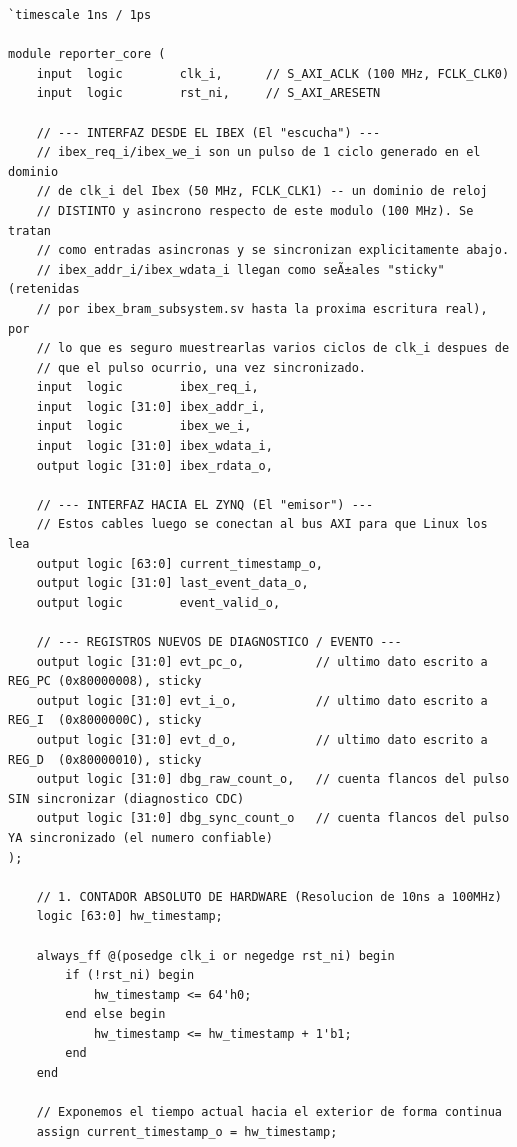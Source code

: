 \begin{lstlisting}[style=verilogstyle, basicstyle=\ttfamily\footnotesize, caption={Código fuente del subsistema \texttt{reporter\_core.sv}}, label={code:reporter_core.sv}]
`timescale 1ns / 1ps

module reporter_core (
    input  logic        clk_i,      // S_AXI_ACLK (100 MHz, FCLK_CLK0)
    input  logic        rst_ni,     // S_AXI_ARESETN

    // --- INTERFAZ DESDE EL IBEX (El "escucha") ---
    // ibex_req_i/ibex_we_i son un pulso de 1 ciclo generado en el dominio
    // de clk_i del Ibex (50 MHz, FCLK_CLK1) -- un dominio de reloj
    // DISTINTO y asincrono respecto de este modulo (100 MHz). Se tratan
    // como entradas asincronas y se sincronizan explicitamente abajo.
    // ibex_addr_i/ibex_wdata_i llegan como seÃ±ales "sticky" (retenidas
    // por ibex_bram_subsystem.sv hasta la proxima escritura real), por
    // lo que es seguro muestrearlas varios ciclos de clk_i despues de
    // que el pulso ocurrio, una vez sincronizado.
    input  logic        ibex_req_i,
    input  logic [31:0] ibex_addr_i,
    input  logic        ibex_we_i,
    input  logic [31:0] ibex_wdata_i,
    output logic [31:0] ibex_rdata_o,

    // --- INTERFAZ HACIA EL ZYNQ (El "emisor") ---
    // Estos cables luego se conectan al bus AXI para que Linux los lea
    output logic [63:0] current_timestamp_o,
    output logic [31:0] last_event_data_o,
    output logic        event_valid_o,

    // --- REGISTROS NUEVOS DE DIAGNOSTICO / EVENTO ---
    output logic [31:0] evt_pc_o,          // ultimo dato escrito a REG_PC (0x80000008), sticky
    output logic [31:0] evt_i_o,           // ultimo dato escrito a REG_I  (0x8000000C), sticky
    output logic [31:0] evt_d_o,           // ultimo dato escrito a REG_D  (0x80000010), sticky
    output logic [31:0] dbg_raw_count_o,   // cuenta flancos del pulso SIN sincronizar (diagnostico CDC)
    output logic [31:0] dbg_sync_count_o   // cuenta flancos del pulso YA sincronizado (el numero confiable)
);

    // 1. CONTADOR ABSOLUTO DE HARDWARE (Resolucion de 10ns a 100MHz)
    logic [63:0] hw_timestamp;

    always_ff @(posedge clk_i or negedge rst_ni) begin
        if (!rst_ni) begin
            hw_timestamp <= 64'h0;
        end else begin
            hw_timestamp <= hw_timestamp + 1'b1;
        end
    end

    // Exponemos el tiempo actual hacia el exterior de forma continua
    assign current_timestamp_o = hw_timestamp;


\end{lstlisting}

